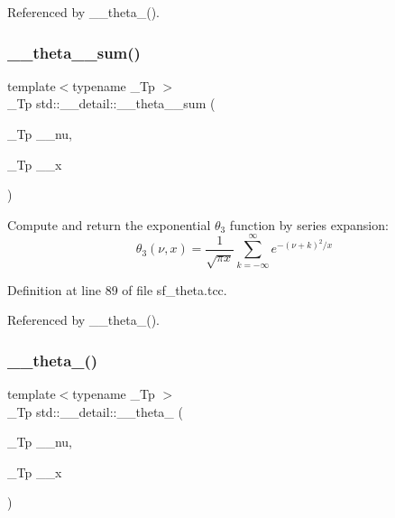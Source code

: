 Referenced by \+\_\+\+\_\+theta\+\_().

\mbox{\label{namespacestd_1_1____detail_a3dc1b5188464b81b6acbb2983ef0f77c}} 
\subsubsection{\texorpdfstring{\+\_\+\+\_\+theta\+\_\+\_\+sum()}{\_\_theta\_3\_sum()}}
{\footnotesize\ttfamily template$<$typename \+\_\+\+Tp $>$ \\
\+\_\+\+Tp std\+::\+\_\+\+\_\+detail\+::\+\_\+\+\_\+theta\+\_\+\_\+sum (\begin{DoxyParamCaption}\item[{\+\_\+\+Tp}]{\+\_\+\+\_\+nu,  }\item[{\+\_\+\+Tp}]{\+\_\+\+\_\+x }\end{DoxyParamCaption})}

Compute and return the exponential $ \theta_3 $ function by series expansion\+: \[ \theta_3(\nu, x) = \frac{1}{\sqrt{\pi x}} \sum_{k=-\infty}^{\infty} e^{-(\nu+k)^2/x} \] 

Definition at line 89 of file sf\+\_\+theta.\+tcc.



Referenced by \+\_\+\+\_\+theta\+\_().

\mbox{\label{namespacestd_1_1____detail_a274d3801b84bcaad13c274c8bab32bcc}} 
\subsubsection{\texorpdfstring{\+\_\+\+\_\+theta\+\_()}{\_\_theta\_4()}}
{\footnotesize\ttfamily template$<$typename \+\_\+\+Tp $>$ \\
\+\_\+\+Tp std\+::\+\_\+\+\_\+detail\+::\+\_\+\+\_\+theta\+\_ (\begin{DoxyParamCaption}\item[{\+\_\+\+Tp}]{\+\_\+\+\_\+nu,  }\item[{\+\_\+\+Tp}]{\+\_\+\+\_\+x }\end{DoxyParamCaption})}

